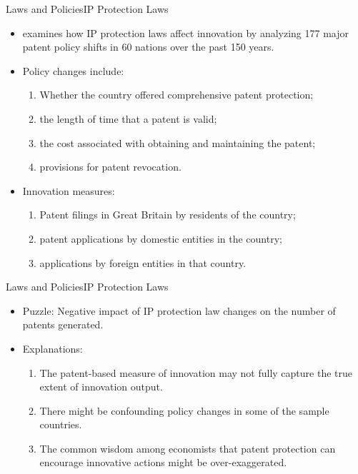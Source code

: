 \documentclass{beamer}
\begin{document}
    \begin{frame}{Laws and Policies}{IP Protection Laws}
        \vspace{-1cm}
        \begin{itemize}
            \item \citet{L2009EmpiricalImpactIntellectual} examines how IP protection laws affect innovation by analyzing 177 major patent policy shifts in 60 nations over the past 150 years.
            \item Policy changes include: 
            \begin{enumerate}
                \item Whether the country offered comprehensive patent protection;
                \item the length of time that a patent is valid;
                \item the cost associated with obtaining and maintaining the patent;
                \item provisions for patent revocation.
            \end{enumerate}
            \item Innovation measures: 
            \begin{enumerate}
                \item Patent filings in Great Britain by residents of the country;
                \item patent applications by domestic entities in the country;
                \item applications by foreign entities in that country.
            \end{enumerate}
        \end{itemize}
    \end{frame}

    \begin{frame}{Laws and Policies}{IP Protection Laws}
        \vspace{-1cm}
        \begin{itemize}
            \item Puzzle: Negative impact of IP protection law changes on the number of patents generated.
            \item Explanations:
            \begin{enumerate}
                \item The patent-based measure of innovation may not fully capture the true extent of innovation output.
                \item There might be confounding policy changes in some of the sample countries.
                \item The common wisdom among economists that patent protection can encourage innovative actions might be over-exaggerated.
            \end{enumerate}
        \end{itemize}
    \end{frame}
\end{document}
